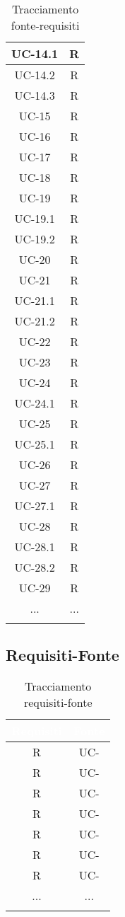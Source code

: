 \begin{xltabular}{\textwidth}{|c | c |}
    \hline
    UC-14.1 & R \\
    \hline
    UC-14.2 & R \\
    \hline
    UC-14.3 & R \\
    \hline
    UC-15 & R \\
    \hline
    UC-16 & R \\
    \hline
    UC-17 & R \\
    \hline
    UC-18 & R \\
    \hline
    UC-19 & R \\
    \hline
    UC-19.1 & R \\
    \hline
    UC-19.2 & R \\
    \hline
    UC-20 & R \\
    \hline
    UC-21 & R \\
    \hline
    UC-21.1 & R \\
    \hline
    UC-21.2 & R \\
    \hline
    UC-22 & R \\
    \hline
    UC-23 & R \\
    \hline
    UC-24 & R \\
    \hline
    UC-24.1 & R \\
    \hline
    UC-25 & R \\
    \hline
    UC-25.1 & R \\
    \hline
    UC-26 & R \\
    \hline
    UC-27 & R \\
    \hline
    UC-27.1 & R \\
    \hline
    UC-28 & R \\
    \hline
    UC-28.1 & R \\
    \hline
    UC-28.2 & R \\
    \hline
    UC-29 & R \\
    \hline
    ... & ... \\
    \hline
     \caption{Tracciamento fonte-requisiti}
    \label{tab:riepilogo}
\end{xltabular}
\subsection{Requisiti-Fonte}
\renewcommand{\arraystretch}{1.5}
\begin{xltabular}{\textwidth}{|c | c |}
    \hline
     \textbf{\textcolor{white}{Requisiti}} & \textbf{\textcolor{white}{Fonte}}\\
    \hline
    \endhead
    R & UC- \\
    \hline
    R & UC- \\
    \hline
    R & UC-\\
    \hline
    R & UC-\\
    \hline
    R & UC-\\
    \hline
    R & UC-\\
    \hline
    R& UC-\\
    \hline
    ... & ... \\
    \hline
     \caption{Tracciamento requisiti-fonte}
    \label{tab:riepilogo}
\end{xltabular}

